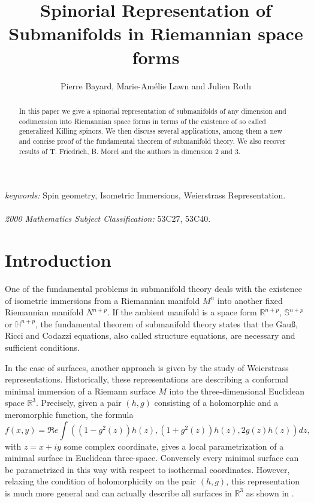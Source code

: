 \documentclass{amsart}
\begin{document}
\title{Spinorial Representation of Submanifolds in Riemannian space forms}
\author{Pierre Bayard, Marie-Am\'elie Lawn and  Julien Roth}

\maketitle

\begin{abstract}
In this paper we give a spinorial representation of submanifolds of any dimension and codimension into Riemannian space forms in terms of the existence of so called generalized Killing spinors. We then discuss several applications, among them a new and concise proof of the fundamental theorem of submanifold theory. We also recover results of T. Friedrich, B. Morel and the authors in dimension 2 and 3. \end{abstract}
{\it keywords:} Spin geometry, Isometric Immersions, Weierstrass Representation.\\\\
\noindent
{\it 2000 Mathematics Subject Classification:} 53C27, 53C40.

\date{}
\maketitle{}
\section{Introduction}
One of the fundamental problems in submanifold theory deals with the existence of isometric
immersions from a Riemannian manifold $M^n$ into another fixed Riemannian manifold $N^{n+p}$. If the ambient manifold is a space form $\mathbb{R}^{n+p}$, $\mathbb{S}^{n+p}$ or $\mathbb{H}^{n+p}$, the fundamental theorem of submanifold theory states that the Gau\ss, Ricci and Codazzi equations, also called structure equations, are necessary and sufficient conditions.

 In the case of surfaces, another approach is given by the study of Weierstrass representations. Historically, these representations are describing a conformal minimal immersion of a Riemann surface $M$ into the three-dimensional Euclidean space $\mathbb{R}^3$. Precisely, given a pair $(h, g)$ consisting of a holomorphic and a meromorphic function, the formula
$$f(x, y) = \Re e\int\left((1-g^2(z))h(z), (1+g^2(z))h(z), 2g(z)h(z)\right)dz,$$
with $z =x+iy$ some complex coordinate, gives a local parametrization of a
minimal surface in Euclidean three-space. Conversely every minimal surface
can be parametrized in this way with respect to isothermal coordinates. However, relaxing the condition of holomorphicity on the pair $(h,g)$, this representation is much more general and can actually describe all surfaces in $\mathbb{R}^3$ as shown in \cite{Ke}. 
\end{document}
